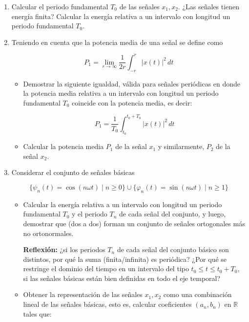 \documentclass[12pt,a4paper]{report}
\begin{document}
\begin{enumerate}[label=\alph*),left=0pt]
  \item Calcular el periodo fundamental $T_0$ de las señales $x_1, x_2$. ¿Las señales tienen energía finita? Calcular
    la energía relativa a un intervalo con longitud un periodo fundamental $T_0$.

  \item Teniendo en cuenta que la potencia media de una señal se define como

  $$P_1 = \lim_{r \to \infty} \frac{1}{2r} \int_{-r}^{r} |x(t)|^2 \, dt$$

    \begin{itemize}[left=0pt]
    \item Demostrar la siguiente igualdad, válida para señales periódicas en donde la potencia media relativa a un
      intervalo con longitud un periodo fundamental $T_0$ coincide con la potencia media, es decir:

     $$P_1 = \frac{1}{T_0} \int_{t_0}^{t_0 + T_0} |x(t)|^2 \, dt$$

    \item Calcular la potencia media $P_1$ de la señal $x_1$ y similarmente, $P_2$ de la señal $x_2$.

  \end{itemize}

  \item Considerar el conjunto de señales básicas

  $$\{\psi_n(t) = \cos(n\omega t) \mid n \geq 0\} \cup \{\varphi_n(t) = \sin(n\omega t) \mid n \geq 1\}$$

    \begin{itemize}[left=0pt]
    \item Calcular la energía relativa a un intervalo con longitud un periodo fundamental $T_0$ y el periodo $T_n$
      de cada señal del conjunto, y luego, demostrar que (dos a dos) forman un conjunto de señales ortogonales más no
      ortonormales.

      \textbf{Reflexión:} ¿si los periodos $T_n$ de cada señal del conjunto básico son distintos, por qué la suma 
      (finita/infinita) es periódica? ¿Por qué se restringe el dominio del tiempo en un intervalo del tipo 
      $t_0 \leq t \leq t_0 + T_0$, si las señales básicas están bien definidas en todo el eje temporal?

   \item Obtener la representación de las señales $x_1, x_2$ como una combinación lineal de las señales básicas, 
     esto es, calcular coeficientes $(a_n, b_n)$ en $\mathbb{R}$ tales que:


\end{itemize}
\end{enumerate}
\end{document}
